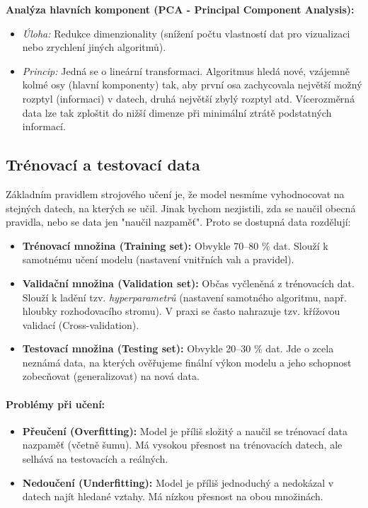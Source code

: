\textbf{Analýza hlavních komponent (PCA - Principal Component Analysis):}
\begin{itemize}
    \item \textit{Úloha:} Redukce dimenzionality (snížení počtu vlastností dat pro vizualizaci nebo zrychlení jiných algoritmů).
    \item \textit{Princip:} Jedná se o lineární transformaci. Algoritmus hledá nové, vzájemně kolmé osy (hlavní komponenty) tak, aby první osa zachycovala největší možný rozptyl (informaci) v datech, druhá největší zbylý rozptyl atd. Vícerozměrná data lze tak zploštit do nižší dimenze při minimální ztrátě podstatných informací.
\end{itemize}

\subsection{Trénovací a testovací data}
Základním pravidlem strojového učení je, že model nesmíme vyhodnocovat na stejných datech, na kterých se učil. Jinak bychom nezjistili, zda se naučil obecná pravidla, nebo se data jen "naučil nazpaměť". Proto se dostupná data rozdělují:

\begin{itemize}
    \item \textbf{Trénovací množina (Training set):} Obvykle 70--80 \% dat. Slouží k samotnému učení modelu (nastavení vnitřních vah a pravidel).
    \item \textbf{Validační množina (Validation set):} Občas vyčleněná z trénovacích dat. Slouží k ladění tzv. \textit{hyperparametrů} (nastavení samotného algoritmu, např. hloubky rozhodovacího stromu). V praxi se často nahrazuje tzv. křížovou validací (Cross-validation).
    \item \textbf{Testovací množina (Testing set):} Obvykle 20--30 \% dat. Jde o zcela neznámá data, na kterých ověřujeme finální výkon modelu a jeho schopnost zobecňovat (generalizovat) na nová data.
\end{itemize}

\paragraph*{Problémy při učení:}
\begin{itemize}
    \item \textbf{Přeučení (Overfitting):} Model je příliš složitý a naučil se trénovací data nazpaměť (včetně šumu). Má vysokou přesnost na trénovacích datech, ale selhává na testovacích a reálných.
    \item \textbf{Nedoučení (Underfitting):} Model je příliš jednoduchý a nedokázal v datech najít hledané vztahy. Má nízkou přesnost na obou množinách.
\end{itemize}

